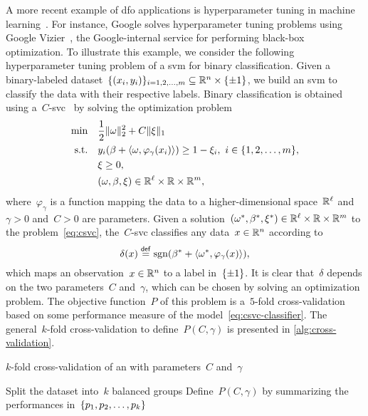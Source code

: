 A more recent example of \gls{dfo} applications is hyperparameter tuning in machine learning~\cite{Ghanbari_Scheinberg_2017}.
For instance, Google solves hyperparameter tuning problems using Google Vizier~\cite{Golovin_Etal_2017}, the Google-internal service for performing black-box optimization.
To illustrate this example, we consider the following hyperparameter tuning problem of a \gls{svm} for binary classification.
Given a binary-labeled dataset~$\{(x_i, y_i)\}_{i = 1, 2, \dots, m} \subseteq \mathbb{R}^n \times \{\pm 1\}$, we build an \gls{svm} to classify the data with their respective labels.
Binary classification is obtained using a~$C$-\gls{svc}~\cite{Chang_Lin_2011} by solving the optimization problem
\begin{subequations}
    \label{eq:csvc}
    \begin{align}
        \min        & \quad \frac{1}{2} \lVert\omega\rVert_2^2 + C \lVert\xi\rVert_1\\
        \text{s.t.} & \quad y_i (\beta + \langle\omega, \varphi_{\gamma}(x_i)\rangle) \ge 1 - \xi_i, ~ i \in \{1, 2, \dots, m\},\\
                    & \quad \xi \ge 0,\\
                    & \quad (\omega, \beta, \xi) \in \mathbb{R}^{\ell} \times \mathbb{R} \times \mathbb{R}^m,
    \end{align}
\end{subequations}
where~$\varphi_{\gamma}$ is a function mapping the data to a higher-dimensional space~$\mathbb{R}^{\ell}$ and~$\gamma > 0$ and~$C > 0$ are parameters.
Given a solution~$(\omega^{\ast}, \beta^{\ast}, \xi^{\ast}) \in \mathbb{R}^{\ell} \times \mathbb{R} \times \mathbb{R}^m$ to the problem~\cref{eq:csvc}, the~$C$-\gls{svc} classifies any data~$x \in \mathbb{R}^n$ according to
\begin{equation}
    \label{eq:csvc-classifier}
    \delta(x) \mathrel{\stackrel{\mathsf{def}}{=}} \operatorname{sgn}(\beta^{\ast} + \langle\omega^{\ast}, \varphi_{\gamma}(x)\rangle),
\end{equation}
which maps an observation~$x \in \mathbb{R}^n$ to a label in~$\{\pm 1\}$.
It is clear that~$\delta$ depends on the two parameters~$C$ and~$\gamma$, which can be chosen by solving an optimization problem.
The objective function~$P$ of this problem is a~$5$-fold cross-validation based on some performance measure of the model~\cref{eq:csvc-classifier}.
The general~$k$-fold cross-validation to define~$P(C, \gamma)$ is presented in \cref{alg:cross-validation}.

\begin{algorithm}[ht]
    \caption{$k$-fold cross-validation of an  with parameters~$C$ and~$\gamma$}
    \label{alg:cross-validation}
    \DontPrintSemicolon
    Split the dataset into~$k$ balanced groups\;
    Define~$P(C, \gamma)$ by summarizing the performances in~$\{p_1, p_2, \dots, p_k\}$\;
\end{algorithm}

